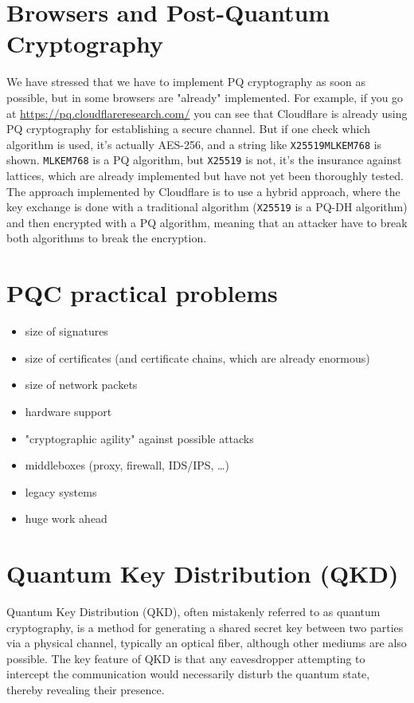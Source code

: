 \section{Browsers and Post-Quantum Cryptography}
We have stressed that we have to implement PQ cryptography as soon as 
possible, but in some browsers are "already" implemented. For example,
if you go at \url{https://pq.cloudflareresearch.com/} you can see that 
Cloudflare is already using PQ cryptography for establishing a secure
channel. But if one check which algorithm is used, it's actually
AES-256, and a string like \texttt{X25519MLKEM768} is shown.
\texttt{MLKEM768} is a PQ algorithm, but \texttt{X25519} is not, it's
the insurance against lattices, which are already implemented but have
not yet been thoroughly tested. The approach implemented by Cloudflare 
is to use a hybrid approach, where the key exchange is done with a 
traditional algorithm (\texttt{X25519} is a PQ-DH algorithm) and then
encrypted with a PQ algorithm, meaning that an attacker have to break 
both algorithms to break the encryption.

\section{PQC practical problems}
\begin{itemize}
  \item size of signatures
  \item size of certificates (and certificate chains, which are
    already enormous)
  \item size of network packets
  \item hardware support
  \item "cryptographic agility" against possible attacks
  \item middleboxes (proxy, firewall, IDS/IPS, …)
  \item legacy systems
  \item huge work ahead 
\end{itemize}

\section{Quantum Key Distribution (QKD)}

Quantum Key Distribution (QKD), often mistakenly referred to as
quantum cryptography, is a method for generating a shared secret key
between two parties via a physical channel, typically an optical
fiber, although other mediums are also possible. The key feature of
QKD is that any eavesdropper attempting to intercept the communication
would necessarily disturb the quantum state, thereby revealing their
presence.

